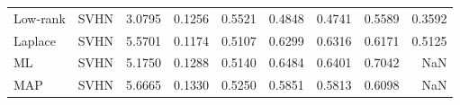 \begin{tabular}{llrrrrrrr}
    Low-rank &         SVHN &  3.0795 &    0.1256 & 0.5521 &      0.4848 &        0.4741 &        0.5589 & 0.3592 \\
     Laplace &         SVHN &  5.5701 &    0.1174 & 0.5107 &      0.6299 &        0.6316 &        0.6171 & 0.5125 \\
          ML &         SVHN &  5.1750 &    0.1288 & 0.5140 &      0.6484 &        0.6401 &        0.7042 &    NaN \\
         MAP &         SVHN &  5.6665 &    0.1330 & 0.5250 &      0.5851 &        0.5813 &        0.6098 &    NaN \\
\bottomrule
\end{tabular}
